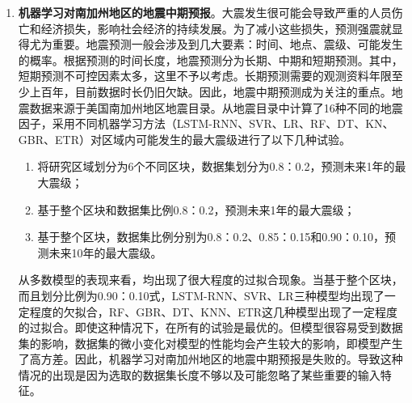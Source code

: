 \begin{enumerate}
    \item \textbf{机器学习对南加州地区的地震中期预报}。大震发生很可能会导致严重的人员伤亡和经济损失，影响社会经济的持续发展。为了减小这些损失，预测强震就显得尤为重要。地震预测一般会涉及到几大要素：时间、地点、震级、可能发生的概率。根据预测的时间长度，地震预测分为长期、中期和短期预测。其中，短期预测不可控因素太多，这里不予以考虑。长期预测需要的观测资料年限至少上百年，目前数据时长仍旧欠缺。因此，地震中期预测成为关注的重点。地震数据来源于美国南加州地区地震目录。从地震目录中计算了16种不同的地震因子，采用不同机器学习方法（LSTM-RNN、SVR、LR、RF、DT、KN、GBR、ETR）对区域内可能发生的最大震级进行了以下几种试验。
    \begin{enumerate}
      \item 将研究区域划分为6个不同区块，数据集划分为0.8：0.2，预测未来1年的最大震级；
      \item 基于整个区块和数据集比例0.8：0.2，预测未来1年的最大震级；
      \item 基于整个区块，数据集比例分别为0.8：0.2、0.85：0.15和0.90：0.10，预测未来10年的最大震级。
    \end{enumerate}
    
    从多数模型的表现来看，均出现了很大程度的过拟合现象。当基于整个区块，而且划分比例为0.90：0.10式，LSTM-RNN、SVR、LR三种模型均出现了一定程度的欠拟合，RF、GBR、DT、KNN、ETR这几种模型出现了一定程度的过拟合。即使这种情况下，在所有的试验是最优的。但模型很容易受到数据集的影响，数据集的微小变化对模型的性能均会产生较大的影响，即模型产生了高方差。因此，机器学习对南加州地区的地震中期预报是失败的。导致这种情况的出现是因为选取的数据集长度不够以及可能忽略了某些重要的输入特征。

\end{enumerate}